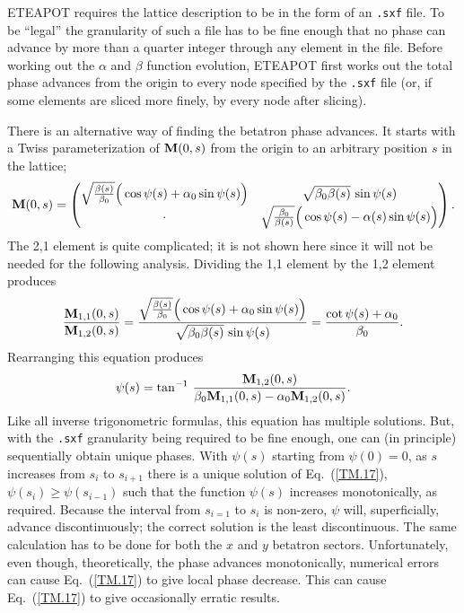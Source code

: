 \documentclass[]{article}
\begin{document}
ETEAPOT requires the lattice description to be in the form
of an {\tt .sxf} file.  To be ``legal'' the granularity of such
a file has to be fine enough that no phase can advance by more
than a quarter integer through any element in the file. Before
working out the $\alpha$ and $\beta$ function evolution, 
ETEAPOT first works out the total phase advances from
the origin to every node specified by the {\tt .sxf} file
(or, if some elements are sliced more finely, by every node
after slicing). 

There is an alternative way of finding the betatron phase
advances. It starts with a Twiss parameterization
of ${\bf M}(0,s)$ from the origin to an arbitrary position $s$
in the lattice;
%
\begin{equation}
{\bf M}(0, s)
 =
\begin{pmatrix}
\sqrt{\frac{\beta(s)}{\beta_0}}\Big(\cos\psi(s) + \alpha_0\sin\psi(s)\Big) & 
            \sqrt{\beta_0\beta(s)}\,\sin\psi(s)                         \\
   \cdot & 
\sqrt{\frac{\beta_0}{\beta(s)}}\Big(\cos\psi(s) - \alpha(s)\sin\psi(s)\Big)         
\end{pmatrix}.
\label{TM.15}
\end{equation}
%
The 2,1 element is quite complicated; it is not shown here since it will not be needed
for the following analysis. Dividing the 1,1 element by the 1,2 element produces
%
\begin{equation}
\frac{{\bf M}_{1,1}(0, s)}{{\bf M}_{1,2}(0, s)}
 =
\frac{\sqrt{\frac{\beta(s)}{\beta_0}}\Big(\cos\psi(s) + \alpha_0\sin\psi(s)\Big)}
     {\sqrt{\beta_0\beta(s)}\,\sin\psi(s)}
 =
\frac{\cot\psi(s) + \alpha_0}{\beta_0}.
\label{TM.16}
\end{equation}
%
Rearranging this equation produces
%
\begin{equation}
\psi(s)
 = 
\tan^{-1}\,
\frac{{\bf M}_{1,2}(0, s)}
     {\beta_0{\bf M}_{1,1}(0, s) - \alpha_0{\bf M}_{1,2}(0, s)}.
\label{TM.17}
\end{equation}
%
Like all inverse trigonometric formulas, this equation has multiple solutions.
But, with the {\tt .sxf} granularity being required to be fine enough, one
can (in principle) sequentially obtain unique phases. With
$\psi(s)$ starting from $\psi(0)=0$, as $s$ increases
from $s_i$ to $s_{i+1}$ there is a unique solution of Eq.~(\ref{TM.17}),
$\psi(s_i)\ge\psi(s_{i-1})$ such that the function $\psi(s)$ increases 
monotonically, as required.
Because the interval from $s_{i=1}$ to $s_i$ is non-zero, $\psi$ will,
superficially, advance discontinuously; the correct solution is the least
discontinuous. The same calculation has to be done for both the $x$ 
and $y$ betatron sectors. 
Unfortunately, even though, theoretically, the phase advances 
monotonically, numerical errors can cause Eq.~(\ref{TM.17}) to
give local phase decrease.  This can cause 
Eq.~(\ref{TM.17}) to give occasionally erratic results.
\end{document}
